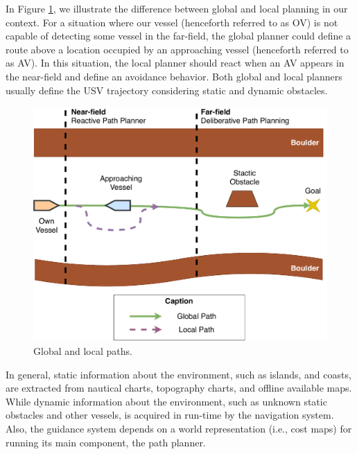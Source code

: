     In Figure \ref{fig:chap2_globallocalpath}, we illustrate the difference between global and local planning in our context. For a situation where our vessel (henceforth referred to as \ac{OV}) is not capable of detecting some vessel in the far-field, the global planner could define a route above a location occupied by an approaching vessel (henceforth referred to as \ac{AV}). In this situation, the local planner should react when an \ac{AV} appears in the near-field and define an avoidance behavior. Both global and local planners usually define the \ac{USV} trajectory considering static and dynamic obstacles.
    
    \begin{figure}[H]
        \centering
        \includegraphics[scale=0.6]{figs/Chap2/GlobalLocalPath.pdf}
        \caption{Global and local paths.}
        \label{fig:chap2_globallocalpath}
    \end{figure}

    In general, static information about the environment, such as islands, and coasts, are extracted from nautical charts, topography charts, and offline available maps. While dynamic information about the environment, such as unknown static obstacles and other vessels, is acquired in run-time by the navigation system. Also, the guidance system depends on a world representation (i.e., cost maps) for running its main component, the path planner.

